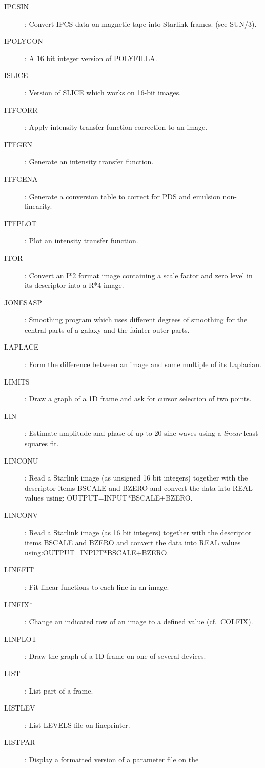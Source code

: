 \begin{description}
\item [IPCSIN]: Convert IPCS data on magnetic tape into Starlink frames.
(see SUN/3).
\item [IPOLYGON]: A 16 bit integer version of POLYFILLA.
\item [ISLICE]: Version of SLICE which works on 16-bit images.
\item [ITFCORR]: Apply intensity transfer function correction to an image.
\item [ITFGEN]: Generate an intensity transfer function.
\item [ITFGENA]: Generate a conversion table to correct for PDS and emulsion
non-linearity.
\item [ITFPLOT]: Plot an intensity transfer function.
\item [ITOR]: Convert an I*2 format image containing a scale factor and zero
level in its descriptor into a R*4 image.
\item [JONESASP]: Smoothing program which uses different degrees of smoothing
for the central parts of a galaxy and the fainter outer parts.
\item [LAPLACE]: Form the difference between an image and some multiple of its
Laplacian.
\item [LIMITS]: Draw a graph of a 1D frame and ask for cursor selection of two
points.
\item [LIN]: Estimate amplitude and phase of up to 20 sine-waves using a
{\em linear} least squares fit.
\item [LINCONU]: Read a Starlink image (as unsigned 16 bit integers) together
with the descriptor items BSCALE and BZERO and convert the data into REAL
values using: \newline OUTPUT=INPUT*BSCALE+BZERO. 
\item [LINCONV]: Read a Starlink image (as 16 bit integers) together with the
descriptor items BSCALE and BZERO and convert the data into REAL values
using:\newline OUTPUT=INPUT*BSCALE+BZERO.
\item [LINEFIT]: Fit linear functions to each line in an image.
\item [LINFIX*]: Change an indicated row of an image to a defined value
(cf.\ COLFIX).
\item [LINPLOT]: Draw the graph of a 1D frame on one of several devices.
\item [LIST]: List part of a frame.
\item [LISTLEV]: List LEVELS file on lineprinter.
\item [LISTPAR]: Display a formatted version of a parameter file on the

\end{description}
